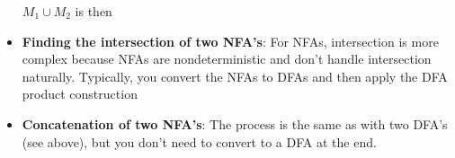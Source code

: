 \documentclass{report}
\begin{document}
\begin{itemize}
\begin{figure}[ht]
            \centering
            \label{fig:machine10}
        \end{figure}
        \bigbreak \noindent 
        $M_1 \cup M_2$ is then
        \begin{figure}[ht]
            \centering
            \label{fig:machine11}
        \end{figure}
        \pagebreak \bigbreak \noindent 
    \item \textbf{Finding the intersection of two NFA's}: 
        For NFAs, intersection is more complex because NFAs are nondeterministic and don't handle intersection naturally. Typically, you convert the NFAs to DFAs and then apply the DFA product construction
    \item \textbf{Concatenation of two NFA's}: The process is the same as with two DFA's (see above), but you don't need to convert to a DFA at the end.

\end{itemize}
\end{document}
